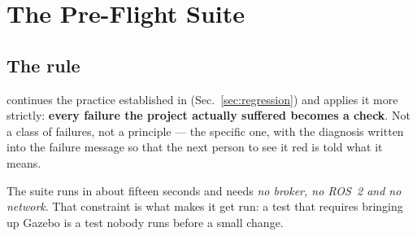 \section{The Pre-Flight Suite}
\label{sec:phaseC_regression}

\subsection{The rule}

\phaseC{} continues the practice established in \phaseB{}
(Sec.~\ref{sec:regression}) and applies it more strictly:
\textbf{every failure the project actually suffered becomes a check}.
Not a class of failures, not a principle --- the specific one, with the
diagnosis written into the failure message so that the next person to
see it red is told what it means.

The suite runs in about fifteen seconds and needs \emph{no broker, no
ROS~2 and no network}. That constraint is what makes it get run: a test
that requires bringing up Gazebo is a test nobody runs before a small
change.

